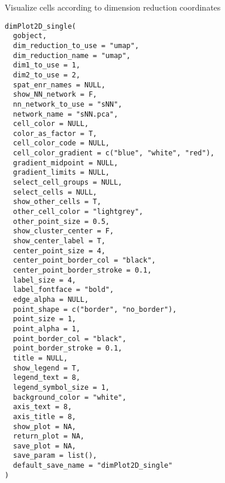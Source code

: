 \documentclass[a4paper]{book}
\begin{document}
%
\begin{Description}\relax
Visualize cells according to dimension reduction coordinates
\end{Description}
%
\begin{Usage}
\begin{verbatim}
dimPlot2D_single(
  gobject,
  dim_reduction_to_use = "umap",
  dim_reduction_name = "umap",
  dim1_to_use = 1,
  dim2_to_use = 2,
  spat_enr_names = NULL,
  show_NN_network = F,
  nn_network_to_use = "sNN",
  network_name = "sNN.pca",
  cell_color = NULL,
  color_as_factor = T,
  cell_color_code = NULL,
  cell_color_gradient = c("blue", "white", "red"),
  gradient_midpoint = NULL,
  gradient_limits = NULL,
  select_cell_groups = NULL,
  select_cells = NULL,
  show_other_cells = T,
  other_cell_color = "lightgrey",
  other_point_size = 0.5,
  show_cluster_center = F,
  show_center_label = T,
  center_point_size = 4,
  center_point_border_col = "black",
  center_point_border_stroke = 0.1,
  label_size = 4,
  label_fontface = "bold",
  edge_alpha = NULL,
  point_shape = c("border", "no_border"),
  point_size = 1,
  point_alpha = 1,
  point_border_col = "black",
  point_border_stroke = 0.1,
  title = NULL,
  show_legend = T,
  legend_text = 8,
  legend_symbol_size = 1,
  background_color = "white",
  axis_text = 8,
  axis_title = 8,
  show_plot = NA,
  return_plot = NA,
  save_plot = NA,
  save_param = list(),
  default_save_name = "dimPlot2D_single"
)
\end{verbatim}
\end{Usage}
%
\end{document}
